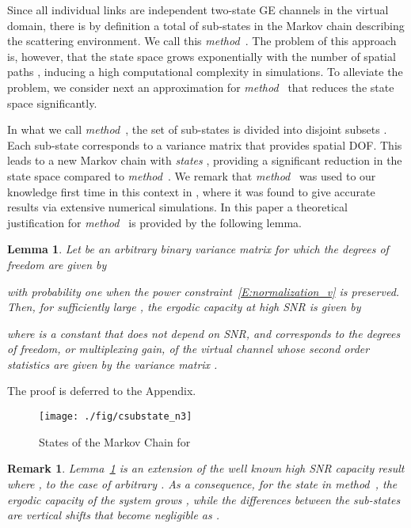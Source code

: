 \documentclass[10pt,conference]{IEEEtran}
\newtheorem{lemma}[theorem]{Lemma}
\newtheorem{remark}{Remark}
\begin{document}
Since all individual links  are independent two-state GE channels in the virtual domain, there is by definition a total of  sub-states in the Markov chain describing the scattering environment.
We call this  \emph{method~}. The problem of this approach is, however, that the state space grows exponentially with the number of spatial paths , inducing a high computational complexity in simulations.  To alleviate the problem, we consider next an approximation for \emph{method~} that reduces the state space significantly.



In what we call \emph{method~}, the set of sub-states  is divided into  disjoint subsets .  Each sub-state   corresponds to a variance matrix  that provides  spatial DOF.  This leads to a new Markov chain with
\emph{states} , providing a significant reduction in the state space compared to \emph{method~}.
We remark that \emph{method~} was used to our knowledge first time in this context in \cite{MIMO:QoS:FSM:Kashif}, where it was found to give accurate results via extensive numerical simulations. In this paper a theoretical justification for \emph{method~} is provided by the following lemma.

\begin{lemma}
\label{lemma:cap_approx_highsnr_2}
Let  be an arbitrary  binary variance matrix for which the degrees of freedom are given by

with probability one  when the power constraint~\eqref{E:normalization_v} is preserved.
Then, for sufficiently large , the ergodic capacity at high SNR is given by

where  is a constant that does not depend on SNR, and
 corresponds to the degrees of freedom, or multiplexing gain, of the virtual channel  whose second order statistics are given by the variance matrix .
\end{lemma}
\begin{IEEEproof}
The proof is deferred to the Appendix.
\end{IEEEproof}
\begin{figure}[t]
\centering
\texttt{[image: ./fig/csubstate\_n3]}
\caption{States of the Markov Chain for }
\label{F:cap_substates}
\end{figure}
\begin{remark}
	\label{remark:cap_approx_highsnr}
	Lemma~\ref{lemma:cap_approx_highsnr_2} is an extension of the well known high SNR capacity result \cite{MIMO:Foschini:98:limits} where , to the case of arbitrary .  As a consequence, for the state  in \emph{method~}, the ergodic capacity of the system grows  , while the differences between the sub-states are  vertical shifts that become negligible as .
\end{remark}
\end{document}
